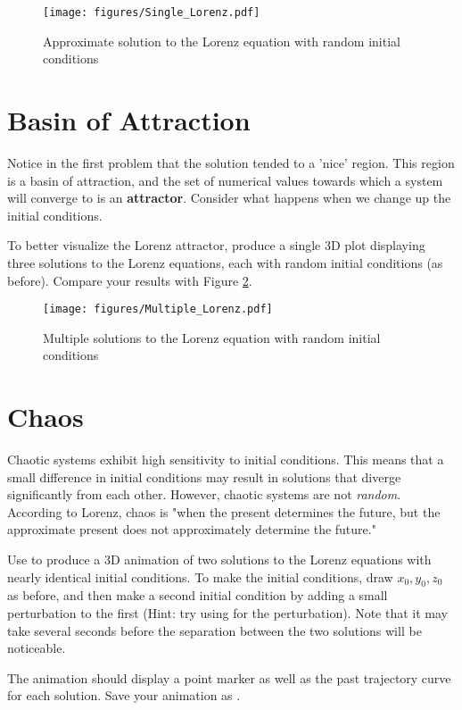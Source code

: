 \begin{figure}
\texttt{[image: figures/Single\_Lorenz.pdf]}
\caption{Approximate solution to the Lorenz equation with random initial conditions}
\label{fig:Single_Lorenz}
\end{figure}

\section*{Basin of Attraction}
Notice in the first problem that the solution tended to a 'nice' region. This region is a basin of attraction, and the set of numerical values towards which a system will converge to is an \textbf{attractor}. Consider what happens when we change up the initial conditions.
\begin{problem}
To better visualize the Lorenz attractor, produce a single 3D plot displaying three solutions to the Lorenz equations, each with random initial conditions (as before). Compare your results with Figure \ref{fig:Multiple_Lorenz}.
\end{problem}

\begin{figure}
\texttt{[image: figures/Multiple\_Lorenz.pdf]}
\caption{Multiple solutions to the Lorenz equation with random initial conditions}
\label{fig:Multiple_Lorenz}
\end{figure}

\section*{Chaos}
Chaotic systems exhibit high sensitivity to initial conditions. This means that a small difference in initial conditions may result in solutions that diverge significantly from each other. However, chaotic systems are not \textit{random}. According to Lorenz, chaos is "when the present determines the future, but the approximate present does not approximately determine the future."

\begin{problem}
Use  to produce a 3D animation of two solutions to the Lorenz equations with nearly identical initial conditions. To make the initial conditions, draw $x_0,y_0,z_0$ as before, and then make a second initial condition by adding a small perturbation to the first (Hint: try using  for the perturbation). Note that it may take several seconds before the separation between the two solutions will be noticeable.

The animation should display a point marker as well as the past trajectory curve for each solution. Save your animation as .
\end{problem}

